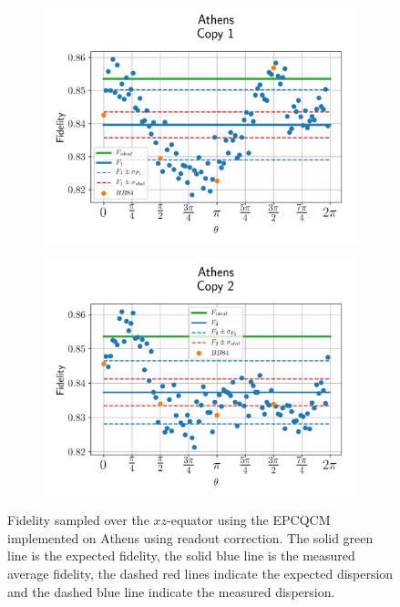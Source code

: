 \begin{figure}[H]
  \centering
  \begin{subfigure}{.5\textwidth}
    \centering
    \includegraphics[width=\textwidth]{Figures/Economical/IBM/OnlyEquator/results_corrected_athens_copy1.png}
    \label{fig:epc_corrected_athens_equator_1}
  \end{subfigure}%
  \begin{subfigure}{.5\textwidth}
    \centering
    \includegraphics[width=\textwidth]{Figures/Economical/IBM/OnlyEquator/results_corrected_athens_copy2.png}
    \label{fig:epc_corrected_athens_equator_2}
  \end{subfigure}
  \vspace{-0.5cm}
  \caption{Fidelity sampled over the $xz$-equator using the EPCQCM implemented on Athens using readout correction. The solid green line is the expected fidelity, the solid blue line is the measured average fidelity, the dashed red lines indicate the expected dispersion and the dashed blue line indicate the measured dispersion.}
  \label{fig:epc_corrected_athens_equator}
\end{figure}

